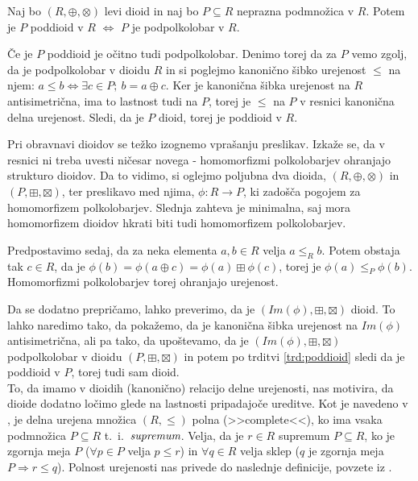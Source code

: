 \documentclass[mat1]{fmfdelo}
\newcommand{\pojem}[1]{\ensuremath{\emph{#1}}}
\newcommand{\map}[3]{\ensuremath{{#1}:{#2}\rightarrow{#3}}}
\begin{document}
\begin{trditev}
	\label{trd:poddioid}
	Naj bo $(R, \oplus, \otimes)$ levi dioid in naj bo $P\subseteq R$ neprazna podmnožica v $R$. Potem je $P$ poddioid v $R$ $\iff$ $P$ je podpolkolobar v $R$.
\end{trditev}

\begin{dokaz}
	Če je $P$ poddioid je očitno tudi podpolkolobar. Denimo torej da za $P$ vemo zgolj, da je podpolkolobar v dioidu $R$ in si poglejmo kanonično šibko urejenost $\leq$ na njem: $a\leq b\iff\exists c\in P;~b = a\oplus c$. Ker je kanonična šibka urejenost na $R$ antisimetrična, ima to lastnost tudi na $P$, torej je $\leq$ na $P$ v resnici kanonična delna urejenost. Sledi, da je $P$ dioid, torej je poddioid v $R$.
\end{dokaz}

Pri obravnavi dioidov se težko izognemo vprašanju preslikav. Izkaže se, da v resnici ni treba uvesti ničesar novega - homomorfizmi polkolobarjev ohranjajo strukturo dioidov. Da to vidimo, si oglejmo poljubna dva dioida, $(R, \oplus, \otimes)$ in $(P, \boxplus, \boxtimes)$, ter preslikavo med njima, $\map{\phi}{R}{P}$, ki zadošča pogojem za homomorfizem polkolobarjev. Slednja zahteva je minimalna, saj mora homomorfizem dioidov hkrati biti tudi homomorfizem polkolobarjev. 

Predpostavimo sedaj, da za neka elementa $a, b\in R$ velja $a\leq_R b$. Potem obstaja tak $c\in R$, da je $\phi(b) = \phi(a\oplus c) = \phi(a) \boxplus\phi(c)$, torej je $\phi(a) \leq_P\phi(b)$. Homomorfizmi polkolobarjev torej ohranjajo urejenost.

Da se dodatno prepričamo, lahko preverimo, da je $(Im(\phi), \boxplus, \boxtimes)$ dioid. To lahko naredimo tako, da pokažemo, da je kanonična šibka urejenost na $Im(\phi)$ antisimetrična, ali pa tako, da upoštevamo, da je $(Im(\phi), \boxplus, \boxtimes)$ podpolkolobar v dioidu $(P, \boxplus, \boxtimes)$ in potem po trditvi \ref{trd:poddioid} sledi da je poddioid v $P$, torej tudi sam dioid.
\newline \\
To, da imamo v dioidih (kanonično) relacijo delne urejenosti, nas motivira, da dioide dodatno ločimo glede na lastnosti pripadajoče ureditve. Kot je navedeno v \cite{bib:Gondran}, je delna urejena množica $(R, \leq)$ polna (>>complete<<), ko ima vsaka podmnožica $P \subseteq R$ t.~i.~\pojem{supremum}. 
Velja, da je $r\in R$ supremum $P\subseteq R$, ko je zgornja meja $P$ ($\forall p \in P$ velja $ p \leq r$) in $\forall q \in R$ velja sklep ($q$ je zgornja meja $P \Rightarrow r \leq q$). Polnost urejenosti nas privede do naslednje definicije, povzete iz \cite{bib:Gondran}.
\end{document}
